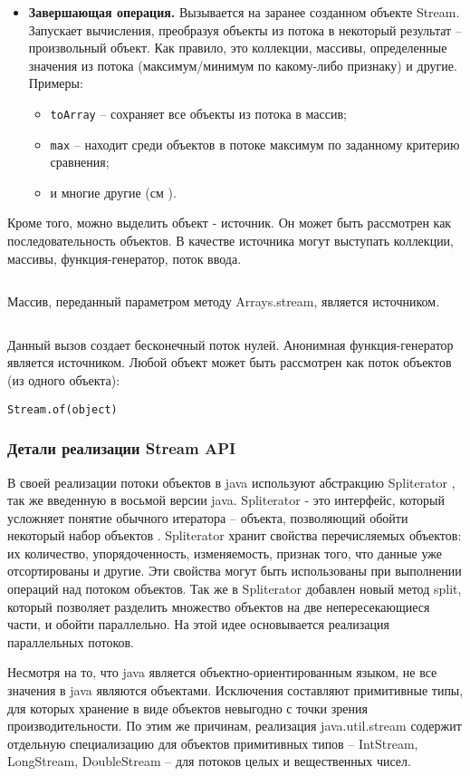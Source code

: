 \begin{itemize}
	\item \textbf{Завершающая операция.} Вызывается на заранее созданном объекте Stream. Запускает вычисления, преобразуя объекты из потока в некоторый результат -- произвольный объект. Как правило, это коллекции, массивы, определенные значения из потока (максимум/минимум по какому-либо признаку) и другие. Примеры:
	\begin{itemize}
		\item \texttt{toArray} -- сохраняет все объекты из потока в массив;
		\item \texttt{max} -- находит среди объектов в потоке максимум по заданному критерию сравнения;
		\item и многие другие (см \cite{java:stream}).
	\end{itemize}
\end{itemize}

Кроме того, можно выделить объект - источник. Он может быть рассмотрен как последовательность объектов. В качестве источника могут выступать коллекции, массивы, функция-генератор, поток ввода.
\inputminted{java}{chapter1/code/IntStream.java}
Массив, переданный параметром методу Arrays.stream, является источником.
\inputminted{java}{chapter1/code/ZerosStream.java}
Данный вызов создает бесконечный поток нулей. Анонимная функция-генератор является источником.
Любой объект может быть рассмотрен как поток объектов (из одного объекта):

\texttt{Stream.of(object)}

\subsubsection{Детали реализации Stream API}\label{streams-desing}
В своей реализации потоки объектов в java используют абстракцию Spliterator 
\cite{java:spliterator}, так же введенную в восьмой версии java. Spliterator - это интерфейс, 
который усложняет понятие обычного итератора -- объекта, позволяющий обойти 
некоторый набор объектов \cite{java:iterator}. Spliterator хранит свойства перечисляемых объектов: их количество, упорядоченность, изменяемость, признак того, что данные уже 
отсортированы и другие. Эти свойства могут быть использованы при выполнении операций над 
потоком объектов. Так же в Spliterator добавлен новый метод split, который позволяет 
разделить множество объектов на две непересекающиеся части, и обойти параллельно. На этой идее основывается реализация параллельных потоков.

Несмотря на то, что java является объектно-ориентированным языком, не все значения в java 
являются объектами. Исключения составляют примитивные типы, для которых хранение в виде 
объектов невыгодно с точки зрения производительности. По этим же причинам, реализация 
java.util.stream содержит отдельную специализацию для объектов примитивных типов -- IntStream, 
LongStream, DoubleStream -- для потоков целых и вещественных чисел. 

